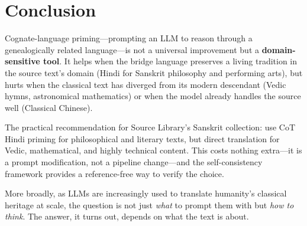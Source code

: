 \documentclass[10pt,twocolumn]{article}
\begin{document}
\section{Conclusion}

Cognate-language priming---prompting an LLM to reason through a genealogically related language---is not a universal improvement but a \textbf{domain-sensitive tool}. It helps when the bridge language preserves a living tradition in the source text's domain (Hindi for Sanskrit philosophy and performing arts), but hurts when the classical text has diverged from its modern descendant (Vedic hymns, astronomical mathematics) or when the model already handles the source well (Classical Chinese).

The practical recommendation for Source Library's Sanskrit collection: use CoT Hindi priming for philosophical and literary texts, but direct translation for Vedic, mathematical, and highly technical content. This costs nothing extra---it is a prompt modification, not a pipeline change---and the self-consistency framework provides a reference-free way to verify the choice.

More broadly, as LLMs are increasingly used to translate humanity's classical heritage at scale, the question is not just \emph{what} to prompt them with but \emph{how to think}. The answer, it turns out, depends on what the text is about.
\end{document}

